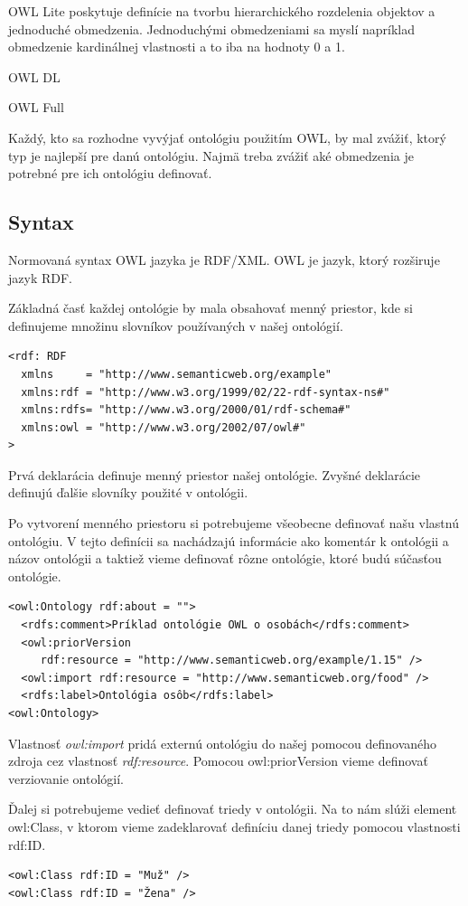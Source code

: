 \documentclass[12pt, a4paper, oneside]{book}
\begin{document}
OWL Lite poskytuje definície na tvorbu hierarchického rozdelenia objektov a jednoduché obmedzenia. Jednoduchými obmedzeniami sa myslí napríklad obmedzenie kardinálnej vlastnosti a to iba na hodnoty 0 a 1. 


OWL DL 


OWL Full


Každý, kto sa rozhodne vyvýjať ontológiu použitím OWL, by mal zvážiť, ktorý typ je najlepší pre danú ontológiu. Najmä treba zvážiť aké obmedzenia je potrebné pre ich ontológiu definovať. 


\subsection{Syntax}
Normovaná syntax OWL jazyka je RDF/XML. OWL je jazyk, ktorý rozširuje jazyk RDF. 


Základná časť každej ontológie by mala obsahovať menný priestor, kde si definujeme množinu slovníkov používaných v našej ontológií.
\begin{verbatim}
<rdf: RDF
  xmlns     = "http://www.semanticweb.org/example"
  xmlns:rdf = "http://www.w3.org/1999/02/22-rdf-syntax-ns#"
  xmlns:rdfs= "http://www.w3.org/2000/01/rdf-schema#"
  xmlns:owl = "http://www.w3.org/2002/07/owl#"
>
\end{verbatim}
Prvá deklarácia definuje menný priestor našej ontológie. Zvyšné deklarácie definujú ďalšie slovníky použité v ontológii.


Po vytvorení menného priestoru si potrebujeme všeobecne definovať našu vlastnú ontológiu. V tejto definícii sa nachádzajú informácie ako komentár k ontológii a názov ontológii a taktiež vieme definovať rôzne ontológie, ktoré budú súčasťou ontológie.
\begin{verbatim}
<owl:Ontology rdf:about = ""> 
  <rdfs:comment>Príklad ontológie OWL o osobách</rdfs:comment>
  <owl:priorVersion 
     rdf:resource = "http://www.semanticweb.org/example/1.15" /> 
  <owl:import rdf:resource = "http://www.semanticweb.org/food" /> 
  <rdfs:label>Ontológia osôb</rdfs:label> 
<owl:Ontology>
\end{verbatim}


Vlastnosť \textit{owl:import} pridá externú ontológiu do našej pomocou definovaného zdroja cez vlastnosť \textit{rdf:resource}. Pomocou owl:priorVersion vieme definovať verziovanie ontológií.


Ďalej si potrebujeme vedieť definovať triedy v ontológii. Na to nám slúži element owl:Class, v ktorom vieme zadeklarovať definíciu danej triedy pomocou vlastnosti rdf:ID.
\begin{verbatim}
<owl:Class rdf:ID = "Muž" />
<owl:Class rdf:ID = "Žena" />
\end{verbatim}
\end{document}
